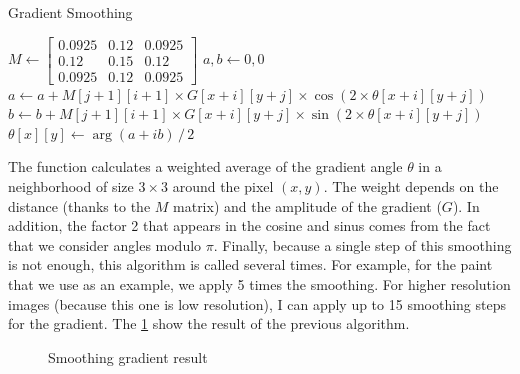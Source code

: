 \documentclass[11pt]{article}
\begin{document}
	\begin{algorithm}[h]
		\caption{Gradient Smoothing}
		\label{alg:gsmooth}
		\begin{algorithmic}
			\State $M \gets \begin{bmatrix}
				0.0925 & 0.12 & 0.0925 \\
				0.12 & 0.15 & 0.12 \\
				0.0925 & 0.12 & 0.0925
			\end{bmatrix}$
			\State $a, b \gets 0, 0$
				\State $a \gets a + M[j+1][i+1] \times G[x+i][y+j] \times \cos \left( 2 \times \theta[x+i][y+j] \right)$
				\State $b \gets b + M[j+1][i+1] \times G[x+i][y+j] \times \sin \left( 2 \times \theta[x+i][y+j] \right)$
			\EndFor
			\State $\theta[x][y] \gets \arg \left( a + ib \right) \, / \, 2$
			\EndFunction
		\end{algorithmic}
	\end{algorithm}

	The function calculates a weighted average of the gradient angle $\theta$ in a neighborhood of size $3 \times 3$ around the pixel $(x, y)$. The weight depends on the distance (thanks to the $M$ matrix) and the amplitude of the gradient ($G$). In addition, the factor 2 that appears in the cosine and sinus comes from the fact that we consider angles modulo $\pi$. Finally, because a single step of this smoothing is not enough, this algorithm is called several times. For example, for the paint that we use as an example, we apply 5 times the smoothing. For higher resolution images (because this one is low resolution), I can apply up to 15 smoothing steps for the gradient. The \figurename \ref{im:gsmooth} show the result of the previous algorithm.
	
	\begin{figure}[h]
		\centering
		\vspace{-1mm}
		\caption{Smoothing gradient result}
		\label{im:gsmooth}
	\end{figure}
\end{document}
